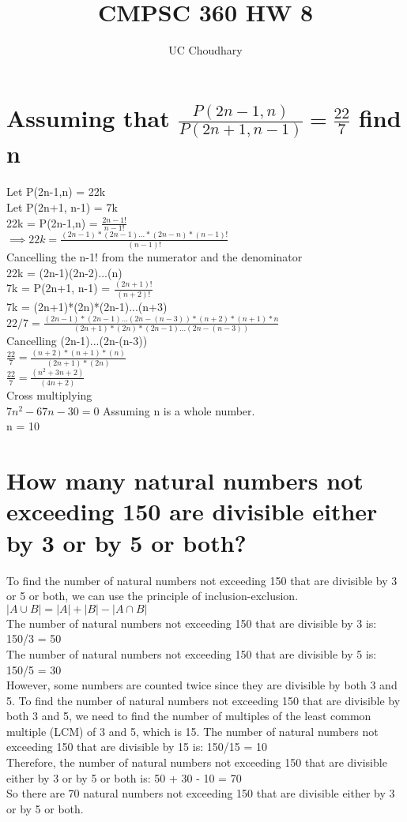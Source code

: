 \documentclass{article}
\title{CMPSC 360 HW 8}
\author{UC Choudhary}
\begin{document}
\maketitle

\hline
\section{Assuming that $\frac{P(2n-1,n)}{P(2n+1,n-1)} = \frac{22}{7}$ find n}
\large Let P(2n-1,n) = 22k\\
\large Let P(2n+1, n-1) = 7k\\
\large 22k = P(2n-1,n) = $\frac{2n-1!}{n-1!}$\\
$\implies 22k = \frac{(2n-1)*(2n-1)...*(2n-n)*(n-1)!}{(n-1)!}$\\
Cancelling the n-1! from the numerator and the denominator\\
22k = (2n-1)(2n-2)...(n)\\

\large 7k = P(2n+1, n-1) = $\frac{(2n+1)!}{(n+2)!}$
\\
7k = (2n+1)*(2n)*(2n-1)...(n+3)\\

$22/7 = \frac{(2n-1)*(2n-1)...(2n-(n-3))*(n+2)*(n+1)*n}{(2n+1)*(2n)*(2n-1)...(2n-(n-3))}$\\
Cancelling (2n-1)...(2n-(n-3))\\
$\frac{22}{7} = \frac{(n+2)*(n+1)*(n)}{(2n+1)*(2n)}$\\
$\frac{22}{7} = \frac{(n^2 + 3n + 2)}{(4n+2)}$\\
Cross multiplying\\
$7n^2 - 67n - 30 = 0$
Assuming n is a whole number.
\\n = 10
\hline

\section{How many natural numbers not exceeding 150 are divisible either by 3 or by 5 or both?}
To find the number of natural numbers not exceeding 150 that are divisible by 3 or 5 or both, we can use the principle of inclusion-exclusion.\\
$|A \cup B| = |A| + |B| - |A\cap B|$\\
The number of natural numbers not exceeding 150 that are divisible by 3 is:
150/3 = 50\\
The number of natural numbers not exceeding 150 that are divisible by 5 is:
150/5 = 30\\
However, some numbers are counted twice since they are divisible by both 3 and 5. To find the number of natural numbers not exceeding 150 that are divisible by both 3 and 5, we need to find the number of multiples of the least common multiple (LCM) of 3 and 5, which is 15. The number of natural numbers not exceeding 150 that are divisible by 15 is:
150/15 = 10\\
Therefore, the number of natural numbers not exceeding 150 that are divisible either by 3 or by 5 or both is:
50 + 30 - 10 = 70\\
So there are 70 natural numbers not exceeding 150 that are divisible either by 3 or by 5 or both.\\
\hline
\end{document}
